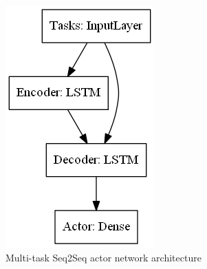 \begin{figure}[H]
    \centering
    \begin{minipage}{0.45\linewidth}
        \centering
        \includegraphics[width=\linewidth]{figures/3_solution_figs/multi_task_actor_weighting_network_architecture.png}
        \caption{Multi-task Seq2Seq actor network architecture}
        \label{fig:seq2seq_actor_network_architecture}
    \end{minipage}\hfill
    \begin{minipage}{0.55\linewidth}
        \centering

\end{minipage}
\end{figure}
